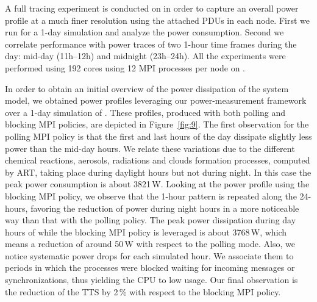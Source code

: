 A full tracing experiment is conducted on \tinto in order to capture an overall power
profile at a much finer resolution using the attached PDUs in each node. First we run \cosmoart 
for a 1-day simulation and analyze the power consumption. Second we correlate performance 
with power traces of two 1-hour time frames during the day: mid-day (11h--12h) and
midnight (23h--24h). All the experiments were performed using 192 cores using 12 MPI processes
per node on \tinto.


In order to obtain an initial overview of the power dissipation of the system model, we obtained power profiles leveraging our \pmlib power-measurement framework over a 1-day simulation of \cosmoart. These profiles, produced with both polling and blocking MPI policies, are depicted in  Figure~\ref{fig:9}. The first observation for the polling MPI policy is that the first and last hours of the day dissipate slightly less power than the mid-day hours. We relate these variations due to the different chemical reactions, aerosols, radiations and clouds formation processes, computed by ART, taking place during daylight hours but not during night. In this case the peak power consumption is about 3821\,W. Looking at the power profile using the blocking MPI policy, we observe that the 1-hour pattern is repeated along the 24-hours, favoring the reduction of power during night hours in a more noticeable way than that with the polling policy. The peak power dissipation during day hours of while the blocking MPI policy is leveraged is about 3768\,W, which means a reduction of around 50\,W with respect to the polling mode. Also, we notice systematic power drops for each simulated hour. We associate them to periods in which the processes were blocked waiting for incoming messages or synchronizations, thus yielding the CPU to low usage. Our final observation is the reduction of the TTS by 2\,\% with respect to the blocking MPI policy.

